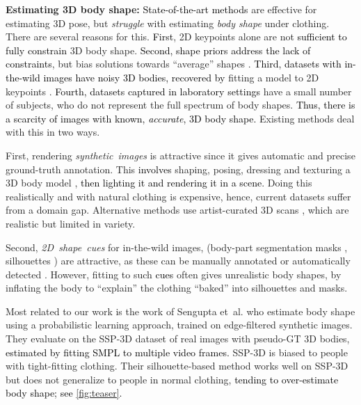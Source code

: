 \documentclass[10pt,twocolumn,letterpaper]{article}
\newcommand{\zheading}[1]{\textbf{#1:}}
\newcommand{\TODO}[1]{\xspace{\color{red} #1}\xspace}
\renewcommand{\TODO}[1]{\xspace{\color{black} #1}\xspace}
\newcommand{\twoD}{2D\xspace}
\newcommand{\threeD}{3D\xspace}
\newcommand{\ssp}{\mbox{SSP-\threeD}\xspace}
\newcommand{\groundtruth}{\mbox{ground-truth}\xspace}
\newcommand{\smpl}{\mbox{SMPL}\xspace}
\newcommand{\inthewild}{\mbox{in-the-wild}\xspace}
\renewcommand{\etal}{\mbox{et al.}\xspace}
\newcommand{\cameraready}[1]{\textcolor{Fuchsia}{{#1}}\xspace}
\renewcommand{\cameraready}[1]{\textcolor{black}{{#1}}\xspace}
\begin{document}
\zheading{Estimating \threeD body shape}
\cameraready{State-of-the-art methods} are effective for estimating \threeD pose, but \emph{struggle} with estimating \emph{body shape} under clothing. 
\TODO{There are several reasons for this.} 
\cameraready{First}, \twoD keypoints alone are not \cameraready{sufficient to fully constrain} \threeD body shape.
\cameraready{Second, shape priors address the lack of constraints}, but \TODO{bias solutions towards ``average'' shapes} \cite{bogo2016keep,Pavlakos2019_smplifyx,Kolotouros2019_spin,mueller2021tuch}. 
\cameraready{Third, datasets with \inthewild images have noisy \threeD bodies, recovered by} fitting  a model to \twoD keypoints \cite{bogo2016keep,Pavlakos2019_smplifyx}. 
\cameraready{Fourth, datasets captured in laboratory settings} have a small number of subjects, who do not represent the full spectrum of body shapes. 
\cameraready{Thus, there is a scarcity of images with known, \emph{accurate}, \threeD body shape.} 
Existing methods deal with this in two ways.

First, rendering 
\mbox{\emph{synthetic images}} is attractive since it gives automatic and precise \groundtruth annotation. 
This 
\cameraready{involves}
shaping, posing, dressing and texturing a \threeD body model \cite{Hoffmann:GCPR:2019,sengupta2020straps,sengupta2021probabilisticCVPR,varol17_surreal,weitz2021infiniteform}, \cameraready{then lighting it and rendering it in a scene}. 
Doing this realistically and with natural clothing is expensive, hence, current datasets suffer from a domain gap.
Alternative methods use artist-curated \threeD scans \cite{saito2019pifu,saito2020pifuhd,patel2020agora}, which are realistic but limited in variety.

Second,
\mbox{\emph{\twoD shape cues}} for \inthewild images, (body-part segmentation masks     \cite{omran2018neural,Ruegg:AAAI:2020,sai2021dsr}, silhouettes  \cite{agarwal_trigs_3d_poses,MuVS_3DV_2017,pavlakos2018learning})
are attractive, as these can be manually annotated or automatically detected \cite{gong2019graphonomy,He2020maskRCNN}. However, fitting to such \cameraready{cues}
often gives unrealistic body shapes, \TODO{by inflating the body to ``explain'' the clothing} ``baked'' into silhouettes and masks. 
 
Most related to our work is the work of Sengupta \etal \cite{sengupta2020straps,sengupta2021probabilisticCVPR,sengupta2021hierarchicalICCV}
who estimate body shape
using a probabilistic learning approach,
trained on \TODO{edge-filtered} synthetic images.
They evaluate on the \ssp dataset of real images with pseudo-GT \threeD bodies,
\cameraready{estimated by fitting \smpl to multiple video frames.}
\ssp is biased to people with tight-fitting clothing.
Their silhouette-based method works well on \ssp but does not generalize
to people in normal clothing, 
\cameraready{tending to over-estimate body shape; see \cref{fig:teaser}.} 
 
\end{document}
